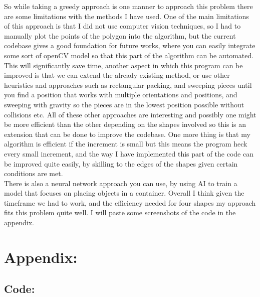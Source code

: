 \documentclass[a4paper]{article}
\begin{document}
So while taking a greedy approach is one manner to approach this problem there are some limitations with the methods I have used. One of the main limitations of this approach is that I did not use computer vision techniques, so I had to manually plot the points of the polygon into the algorithm, but the current codebase gives a good foundation for future works, where you can easily integrate some sort of openCV model so that this part of the algorithm can be automated. This will significantly save time, another aspect in which this program can be improved is that we can extend the already existing method, or use other heuristics and approaches such as rectangular packing, and sweeping pieces until you find a position that works with multiple orientations and positions, and sweeping with gravity so the pieces are in the lowest position possible without collisions etc. All of these other approaches are interesting and possibly one might be more efficient than the other depending on the shapes involved so this is an extension that can be done to improve the codebase. One more thing is that my algorithm is efficient if the increment is small but this means the program heck every small increment, and the way I have implemented this part of the code can be improved quite easily, by skilling to the edges of the shapes given certain conditions are met. \\ 

There is also a neural network approach you can use, by using AI to train a model that focuses on placing objects in a container. Overall I think given the timeframe we had to work, and the efficiency needed for four shapes my approach fits this problem quite well. I will paste some screenshots of the code in the appendix.\\ 






 \newpage    

\section{Appendix: }

\subsection{Code: }
\end{document}
